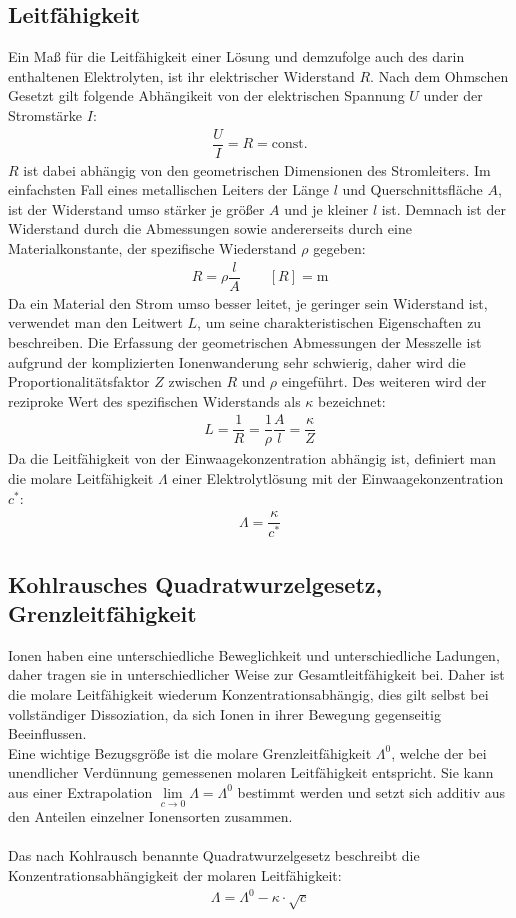 \documentclass[12pt,a4paper,titlepage,headinclude,bibtotoc]{scrartcl}
\begin{document}
\subsection{Leitfähigkeit}
Ein Maß für die Leitfähigkeit einer Lösung und demzufolge auch des darin enthaltenen Elektrolyten, ist ihr elektrischer Widerstand $R$. Nach dem Ohmschen Gesetzt gilt folgende Abhängikeit von der elektrischen Spannung $U$ under der Stromstärke $I$:
\begin{align}
\dfrac{U}{I} = R = \mathrm{const}.
\end{align}
$R$ ist dabei abhängig von den geometrischen Dimensionen des Stromleiters. Im einfachsten Fall eines metallischen Leiters der Länge $l$ und Querschnittsfläche $A$, ist der Widerstand umso stärker je größer $A$ und je kleiner $l$ ist. Demnach ist der Widerstand durch die Abmessungen sowie andererseits durch eine Materialkonstante, der spezifische Wiederstand $\rho $ gegeben:
\begin{align}
R = \rho \dfrac{l}{A} \quad \quad  [R]=  \mathrm{m}
\end{align} 
Da ein Material den Strom umso besser leitet, je geringer sein Widerstand ist, verwendet man den Leitwert $L$, um seine charakteristischen Eigenschaften zu beschreiben. Die Erfassung der geometrischen Abmessungen der Messzelle ist aufgrund der komplizierten Ionenwanderung sehr schwierig, daher wird die Proportionalitätsfaktor $Z$ zwischen $R$ und $\rho$ eingeführt. Des weiteren wird der reziproke Wert des spezifischen Widerstands als $\kappa$ bezeichnet:
\begin{align}
L = \dfrac{1}{R} = \dfrac{1}{\rho } \dfrac{A}{l} = \dfrac{\kappa }{Z}
\end{align} 
Da die Leitfähigkeit von der Einwaagekonzentration abhängig ist, definiert man die molare Leitfähigkeit $\Lambda$ einer Elektrolytlösung mit der Einwaagekonzentration $c^*$:
\begin{align}
\Lambda = \dfrac{\kappa}{c^*}
\end{align}

\subsection{Kohlrausches Quadratwurzelgesetz, Grenzleitfähigkeit}
Ionen haben eine unterschiedliche Beweglichkeit und unterschiedliche Ladungen, daher tragen sie in unterschiedlicher Weise zur Gesamtleitfähigkeit bei. Daher ist die molare Leitfähigkeit wiederum Konzentrationsabhängig, dies gilt selbst bei vollständiger Dissoziation, da sich Ionen in ihrer Bewegung gegenseitig Beeinflussen.\\
Eine wichtige Bezugsgröße ist die molare Grenzleitfähigkeit $\Lambda^0$, welche der bei unendlicher Verdünnung gemessenen molaren Leitfähigkeit entspricht. Sie kann aus einer Extrapolation $ \lim \limits_{c \rightarrow 0 } \Lambda = \Lambda ^0$ bestimmt werden und setzt sich additiv aus den Anteilen einzelner Ionensorten zusammen.\\\\
Das nach Kohlrausch benannte Quadratwurzelgesetz beschreibt die Konzentrationsabhängigkeit der molaren Leitfähigkeit:
\begin{align}
\Lambda = \Lambda ^0 - \kappa \cdot \sqrt{c}
\end{align}
\end{document}
